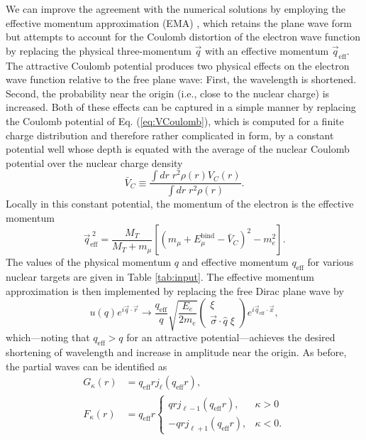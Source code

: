 \documentclass{book}[letterpaper,12pt]
\begin{document}
We can improve the agreement with the numerical solutions by employing the effective momentum approximation (EMA) \cite{KNOLL1974462,LENZ1971513}, which retains the plane wave form but attempts to account for the Coulomb distortion of the electron wave function by replacing the physical three-momentum $\vec{q}$ with an effective momentum $\vec{q}_\mathrm{eff}$. The attractive Coulomb potential produces two physical effects on the electron wave function relative to the free plane wave: First, the wavelength is shortened. Second, the probability near the origin (i.e., close to the nuclear charge) is increased. Both of these effects can be captured in a simple manner by replacing the Coulomb potential of Eq. (\ref{eq:VCoulomb}), which is computed for a finite charge distribution and therefore rather complicated in form, by a constant potential well whose depth is equated with the average of the nuclear Coulomb potential over the nuclear charge density
\begin{equation}
\bar{V}_C\equiv \frac{\int dr \;r^2 \rho(r) V_C(r)}{\int dr \;r^2 \rho(r)}.
\end{equation}
Locally in this constant potential, the momentum of the electron is the effective momentum
\begin{equation}
\vec{q}_\mathrm{eff}^{\;2}=\frac{M_T}{M_T+m_{\mu}}\left[\left(m_{\mu}+E_{\mu}^\mathrm{bind}-\bar{V}_C\right)^2-m_e^2\right].
\end{equation}
The values of the physical momentum $q$ and effective momentum $q_\mathrm{eff}$ for various nuclear targets are given in Table \ref{tab:input}. The effective momentum approximation is then implemented by replacing the free Dirac plane wave by 
\begin{equation}
u(q)e^{i\vec{q}\cdot\vec{r}}\rightarrow\frac{q_\mathrm{eff}}{q}\sqrt{\frac{E_e}{2m_e}}\left(\begin{array}{c}
\xi\\
\vec{\sigma}\cdot\hat{q}\;\xi
\end{array}\right)
e^{i\vec{q}_\mathrm{eff}\cdot\vec{x}},
\end{equation}
which---noting that $q_\mathrm{eff}>q$ for an attractive potential---achieves the desired shortening of wavelength and increase in amplitude near the origin. As before, the partial waves can be identified as
\begin{equation}
\begin{split}
G_{\kappa}(r)&=q_\mathrm{eff}rj_{\ell}(q_\mathrm{eff}r),\\
F_{\kappa}(r)&=q_\mathrm{eff}r\left\{\begin{array}{cc}
qrj_{\ell-1}(q_\mathrm{eff}r), & \kappa>0\\
-qrj_{\ell+1}(q_\mathrm{eff}r), &\kappa < 0.
\end{array}\right. 
\end{split}
\label{eq:ema_bessel}
\end{equation}
\end{document}
